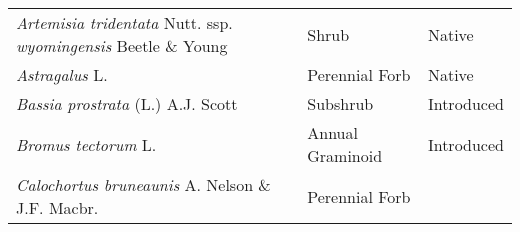 \documentclass[8pt,]{article}
\begin{document}
\begin{longtable}[]{@{}lll@{}}
\begin{minipage}[t]{0.49\columnwidth}\raggedright\strut
\emph{Artemisia tridentata} Nutt. ssp. \emph{wyomingensis} Beetle \&
Young\strut
\end{minipage} & \begin{minipage}[t]{0.27\columnwidth}\raggedright\strut
Shrub\strut
\end{minipage} & \begin{minipage}[t]{0.15\columnwidth}\raggedright\strut
Native\strut
\end{minipage}\tabularnewline
\begin{minipage}[t]{0.49\columnwidth}\raggedright\strut
\emph{Astragalus} L.\strut
\end{minipage} & \begin{minipage}[t]{0.27\columnwidth}\raggedright\strut
Perennial Forb\strut
\end{minipage} & \begin{minipage}[t]{0.15\columnwidth}\raggedright\strut
Native\strut
\end{minipage}\tabularnewline
\begin{minipage}[t]{0.49\columnwidth}\raggedright\strut
\emph{Bassia prostrata} (L.) A.J. Scott\strut
\end{minipage} & \begin{minipage}[t]{0.27\columnwidth}\raggedright\strut
Subshrub\strut
\end{minipage} & \begin{minipage}[t]{0.15\columnwidth}\raggedright\strut
Introduced\strut
\end{minipage}\tabularnewline
\begin{minipage}[t]{0.49\columnwidth}\raggedright\strut
\emph{Bromus tectorum} L.\strut
\end{minipage} & \begin{minipage}[t]{0.27\columnwidth}\raggedright\strut
Annual Graminoid\strut
\end{minipage} & \begin{minipage}[t]{0.15\columnwidth}\raggedright\strut
Introduced\strut
\end{minipage}\tabularnewline
\begin{minipage}[t]{0.49\columnwidth}\raggedright\strut
\emph{Calochortus bruneaunis} A. Nelson \& J.F. Macbr.\strut
\end{minipage} & \begin{minipage}[t]{0.27\columnwidth}\raggedright\strut
Perennial Forb\strut
\end{minipage} & \begin{minipage}[t]{0.15\columnwidth}\raggedright\strut

\end{minipage}
\end{longtable}
\end{document}
